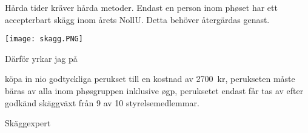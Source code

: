 \documentclass[../_main/handlingar.tex]{subfiles}
\begin{document}
Hårda tider kräver hårda metoder. Endast en person inom phøset har ett accepterbart skägg inom årets
NollU. Detta behöver återgärdas genast. 

\begin{center}
	\texttt{[image: skagg.PNG]}
\end{center}

Därför yrkar jag på
\begin{attsatser}
	\att köpa in nio godtyckliga perukset till en kostnad av \SI{2700}{kr},
	\att perukseten måste bäras av alla inom phøsgruppen inklusive øgp,
	\att peruksetet endast får tas av efter godkänd skäggväxt från 9 av 10 styrelsemedlemmar.
\end{attsatser}

\begin{signatures}{1}
	\mvh
	\signature{Anonym}{Skäggexpert}
\end{signatures}
\end{document}
